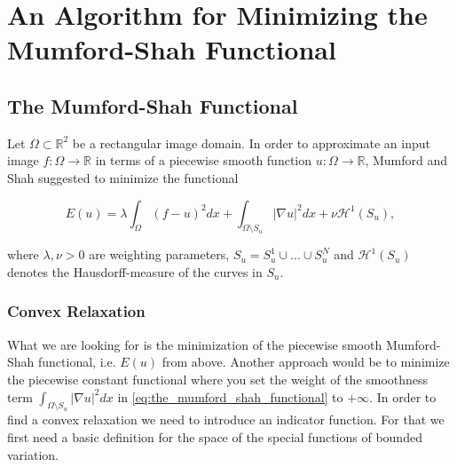 \chapter{An Algorithm for Minimizing the Mumford-Shah Functional} %
\label{cha:an_algorithm_for_minimizing_the_mumford_shah_functional}

    \section{The Mumford-Shah Functional} %
    \label{sec:the_mumford_shah_functional}

        \begin{definition} %
        \label{def:the_mumford_shah_functional}

            Let $\Omega \subset \mathbb{R}^{2}$ be a rectangular image domain. In order to approximate an input image $f: \Omega \longrightarrow \mathbb{R}$ in terms of a piecewise smooth function $u: \Omega \longrightarrow \mathbb{R}$, Mumford and Shah suggested to minimize the functional
                
                \begin{equation}
                    E(u) = \lambda \int_{\Omega} (f - u)^{2} dx + \int_{\Omega \setminus S_{u}} |\nabla u|^{2} dx + \nu \mathcal{H}^{1}(S_{u}),
                \end{equation}
                \label{eq:the_mumford_shah_functional}
            
            where $\lambda, \nu > 0$ are weighting parameters, $S_{u} = S^{1}_{u} \cup ... \cup S^{N}_{u}$ and $\mathcal{H}^{1}(S_{u})$ denotes the Hausdorff-measure of the curves in $S_{u}$.

        \end{definition}



    \subsection{Convex Relaxation} %
    \label{sec:convex_relaxation}

    What we are looking for is the minimization of the piecewise smooth Mumford-Shah functional, i.e. $E(u)$ from above. Another approach would be to minimize the piecewise constant functional where you set the weight of the smoothness term $\int_{\Omega \setminus S_{u}} |\nabla u|^{2} dx$ in \ref{eq:the_mumford_shah_functional} to $+\infty$. In order to find a convex relaxation we need to introduce an indicator function. For that we first need a basic definition for the space of the special functions of bounded variation.

